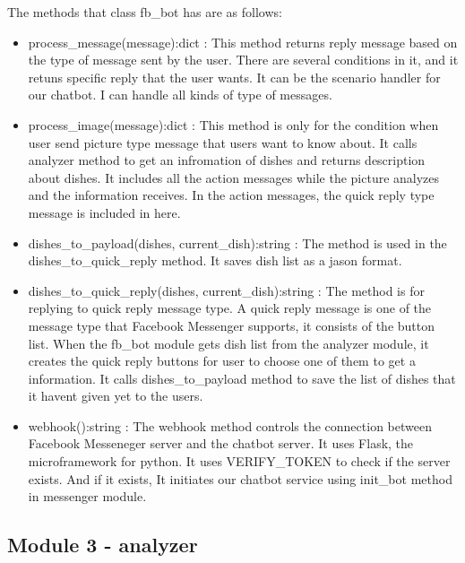 The methods that class fb\_bot has are as follows: \newline

\begin{itemize}
\item process\_message(message):dict : This method returns reply message based on the type of message sent by the user. There are several conditions in it, and it retuns specific reply that the user wants. It can be the scenario handler for our chatbot. I can handle all kinds of type of messages. \newline
\item process\_image(message):dict : This method is only for the condition when user send picture type message that users want to know about. It calls analyzer method to get an infromation of dishes and returns description about dishes. It includes all the action messages while the picture analyzes and the information receives. In the action messages, the quick reply type message is included in here. \newline
\item dishes\_to\_payload(dishes, current\_dish):string : The method is used in the dishes\_to\_quick\_reply method. It saves dish list as a jason format. \newline
\item dishes\_to\_quick\_reply(dishes, current\_dish):string : The method is for replying to quick reply message type. A quick reply message is one of the message type that Facebook Messenger supports, it consists of the button list. When the fb\_bot module gets dish list from the analyzer module, it creates the quick reply buttons for user to choose one of them to get a information. It calls dishes\_to\_payload method to save the list of dishes that it havent given yet to the users. \newline
\item webhook():string : The webhook method controls the connection between Facebook Messeneger server and the chatbot server. It uses Flask, the microframework for python. It uses VERIFY\_TOKEN to check if the server exists. And if it exists, It initiates our chatbot service using init\_bot method in messenger module.
\end{itemize} 

\FloatBarrier


\subsection{Module 3 - analyzer}



